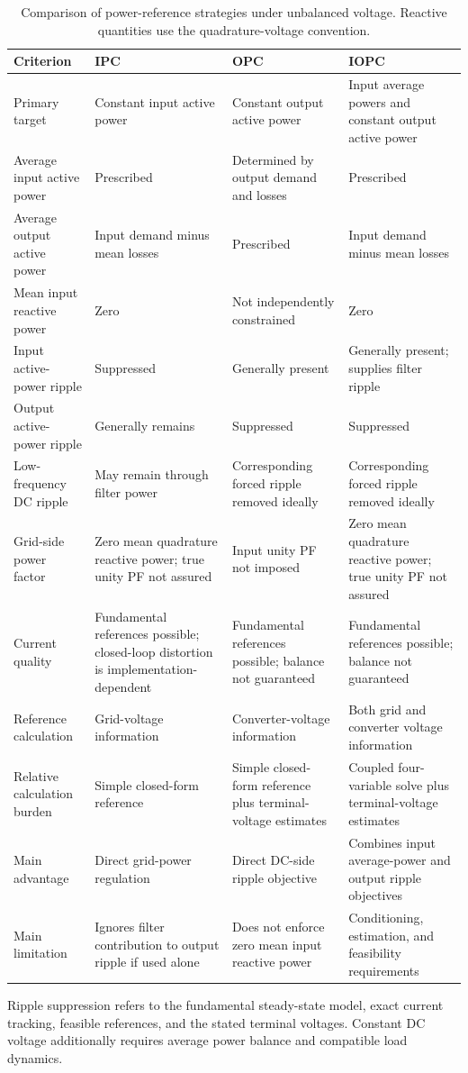 \begin{table}[p]
\centering\small
\caption{Comparison of power-reference strategies under unbalanced voltage. Reactive quantities use the quadrature-voltage convention.}
\label{tab:ch5-comparison}
\renewcommand{\arraystretch}{1.22}
\begin{tabularx}{\textwidth}{@{}>{\raggedright\arraybackslash}p{}*{3}{>{\raggedright\arraybackslash}X}@{}}
\toprule
Criterion & IPC & OPC & IOPC\\\midrule
Primary target & Constant input active power & Constant output active power & Input average powers and constant output active power\\
Average input active power & Prescribed & Determined by output demand and losses & Prescribed\\
Average output active power & Input demand minus mean losses & Prescribed & Input demand minus mean losses\\
Mean input reactive power & Zero & Not independently constrained & Zero\\
Input active-power ripple & Suppressed & Generally present & Generally present; supplies filter ripple\\
Output active-power ripple & Generally remains & Suppressed & Suppressed\\
Low-frequency DC ripple & May remain through filter power & Corresponding forced ripple removed ideally & Corresponding forced ripple removed ideally\\
Grid-side power factor & Zero mean quadrature reactive power; true unity PF not assured & Input unity PF not imposed & Zero mean quadrature reactive power; true unity PF not assured\\
Current quality & Fundamental references possible; closed-loop distortion is implementation-dependent & Fundamental references possible; balance not guaranteed & Fundamental references possible; balance not guaranteed\\
Reference calculation & Grid-voltage information & Converter-voltage information & Both grid and converter voltage information\\
Relative calculation burden & Simple closed-form reference & Simple closed-form reference plus terminal-voltage estimates & Coupled four-variable solve plus terminal-voltage estimates\\
Main advantage & Direct grid-power regulation & Direct DC-side ripple objective & Combines input average-power and output ripple objectives\\
Main limitation & Ignores filter contribution to output ripple if used alone & Does not enforce zero mean input reactive power & Conditioning, estimation, and feasibility requirements\\\bottomrule
\end{tabularx}
\par\smallskip\footnotesize
Ripple suppression refers to the fundamental steady-state model, exact current tracking, feasible references, and the stated terminal voltages. Constant DC voltage additionally requires average power balance and compatible load dynamics.
\end{table}

